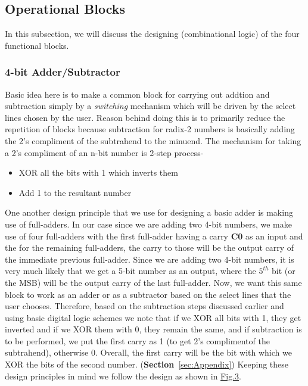 \documentclass[a4paper, titlepage]{article}
\begin{document}
\subsection{Operational Blocks}
In this subsection, we will discuss the designing (combinational logic) of the four functional blocks.
\subsubsection{4-bit Adder/Subtractor}
Basic idea here is to make a common block for carrying out addtion and subtraction simply by a \textit{switching}
mechanism which will be driven by the select lines chosen by the user. Reason behind doing this is to primarily
reduce the repetition of blocks because subtraction for radix-2 numbers is basically adding the 2's compliment 
of the subtrahend to the minuend. \newline 
The mechanism for taking a 2's compliment of an n-bit number is 2-step process-
\begin{itemize}
    \item XOR all the bits with 1 which inverts them 
    \item Add 1 to the resultant number
\end{itemize}
One another design principle that we use for designing a basic adder is making use of full-adders. In our case 
since we are adding two 4-bit numbers, we make use of four full-adders with the first full-adder having a carry \textbf{C0}
as an input and the for the remaining full-adders, the carry to those will be the output carry of the immediate previous 
full-adder. Since we are adding two 4-bit numbers, it is very much likely that we get a 5-bit number as an output, where
the $5^{th}$ bit (or the MSB) will be the output carry of the last full-adder. \newline 
Now, we want this same block to work as an adder or as a subtractor based on the select lines that the user chooses. 
Therefore, based on the subtraction steps discussed earlier and using basic digital logic schemes
we note that if we XOR all bits with 1, they get inverted 
and if we XOR them with 0, they remain the same, and if subtraction is to be performed, we put the first carry as 1 (to get
2's complimentof the subtrahend), otherwise 0. Overall, the first carry will be the bit with which we XOR the bits of the
second number. (\textbf{Section}~\ref{sec:Appendix})\newline 
Keeping these design principles in mind we follow the design as shown in \hyperlink{4AS}{Fig.3}. 
\end{document}
